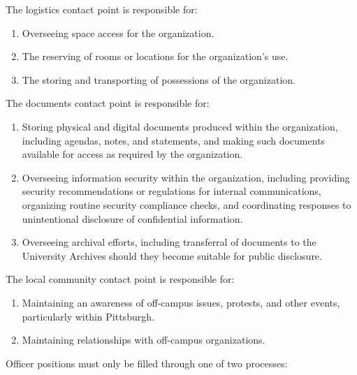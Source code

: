 \documentclass[11pt]{article}
\newcounter{h1}
\newcounter{h2}[h1]
\newcounter{h3}[h2]
\begin{document}

The logistics contact point is responsible for:

\begin{enumerate}
  \item Overseeing space access for the organization.  
  \item The reserving of rooms or locations for the organization's use.  
  \item The storing and transporting of possessions of the organization.
\end{enumerate}


The documents contact point is responsible for:

\begin{enumerate}
  \item Storing physical and digital documents produced within the organization, including agendas, notes, and statements, and making such documents available for access as required by the organization.  
  \item Overseeing information security within the organization, including providing security recommendations or regulations for internal communications, organizing routine security compliance checks, and coordinating responses to unintentional disclosure of confidential information.  
  \item Overseeing archival efforts, including transferral of documents to the University Archives should they become suitable for public disclosure.
\end{enumerate}


The local community contact point is responsible for:

\begin{enumerate}
  \item Maintaining an awareness of off-campus issues, protests, and other events, particularly within Pittsburgh.  
  \item Maintaining relationships with off-campus organizations.
\end{enumerate}



Officer positions must only be filled through one of two processes:
\end{document}
